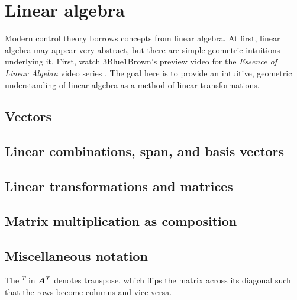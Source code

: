 \section{Linear algebra}

Modern control theory borrows concepts from linear algebra. At first, linear
algebra may appear very abstract, but there are simple geometric intuitions
underlying it. First, watch 3Blue1Brown's preview video for the
\textit{Essence of Linear Algebra} video series \cite{bib:linalg_preview}. The
goal here is to provide an intuitive, geometric understanding of linear algebra
as a method of linear transformations. \\

\subsection{Vectors}

\subsection{Linear combinations, span, and basis vectors}

\subsection{Linear transformations and matrices}

\subsection{Matrix multiplication as composition}

\subsection{Miscellaneous notation}

The $^T$ in $\bm A^T$ denotes transpose, which flips the matrix across its
diagonal such that the rows become columns and vice versa.

